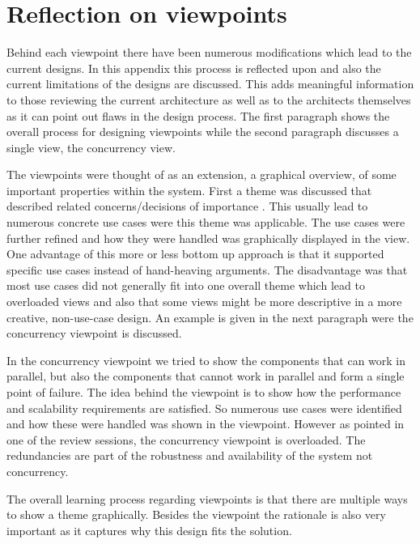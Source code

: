 \section{Reflection on viewpoints}

Behind each viewpoint there have been numerous modifications which lead to the current designs. In this appendix this process is reflected upon and also the current limitations of the designs are discussed. This adds meaningful information to those reviewing the current architecture as well as to the architects themselves as it can point out flaws in the design process. The first paragraph shows the overall process for designing viewpoints while the second paragraph discusses a single view, the concurrency view. \newline

The viewpoints were thought of as an extension, a graphical overview, of some important properties within the system. First a theme was discussed that described related concerns/decisions of importance . This usually lead to numerous concrete use cases were this theme was applicable. The use cases were further refined and how they were handled was graphically displayed in the view. One advantage of this more or less bottom up approach is that it supported specific use cases instead of hand-heaving arguments. The disadvantage was that most use cases did not generally fit into one overall theme which lead to overloaded views and also that some views might be more descriptive in a more creative, non-use-case design. An example is given in the next paragraph were the concurrency viewpoint is discussed.\newline

In the concurrency viewpoint we tried to show the components that can work in parallel, but also the components that cannot work in parallel and form a single point of failure. The idea behind the viewpoint is to show how the performance and scalability requirements are satisfied. So numerous use cases were identified and how these were handled was shown in the viewpoint. However as pointed in one of the review sessions, the concurrency viewpoint is overloaded. The redundancies are part of the robustness and availability of the system not concurrency. \newline 

The overall learning process regarding viewpoints is that there are multiple ways to show a theme graphically. Besides the viewpoint the rationale is also very important as it captures why this design fits the solution.